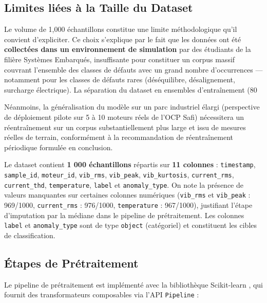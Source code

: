 \documentclass[12pt, a4paper, oneside]{report}
\begin{document}
\subsection{Limites liées à la Taille du Dataset}
Le volume de 1,000 échantillons constitue une limite méthodologique qu'il convient d'expliciter. Ce choix s'explique par le fait que les données ont été \textbf{collectées dans un environnement de simulation} par des étudiants de la filière Systèmes Embarqués, insuffisante pour constituer un corpus massif couvrant l'ensemble des classes de défauts avec un grand nombre d'occurrences — notamment pour les classes de défauts rares (déséquilibre, désalignement, surcharge électrique).
La séparation du dataset en ensembles d’entraînement (80%

Néanmoins, la généralisation du modèle sur un parc industriel élargi (perspective de déploiement pilote sur 5 à 10 moteurs réels de l’OCP Safi) nécessitera un réentraînement sur un corpus substantiellement plus large et issu de mesures réelles de terrain, conformément à la recommandation de réentraînement périodique formulée en conclusion.

Le dataset contient \textbf{1 000 échantillons} répartis sur \textbf{11 colonnes} :
\texttt{timestamp}, \texttt{sample\_id}, \texttt{moteur\_id},
\texttt{vib\_rms}, \texttt{vib\_peak}, \texttt{vib\_kurtosis}, \texttt{current\_rms},
\texttt{current\_thd}, \texttt{temperature}, \texttt{label} et \texttt{anomaly\_type}.
On note la présence de valeurs manquantes sur certaines colonnes numériques (\texttt{vib\_rms} et \texttt{vib\_peak} : 969/1000, \texttt{current\_rms} :
976/1000, \texttt{temperature} : 967/1000), justifiant l'étape d'imputation par la médiane
dans le pipeline de prétraitement. Les colonnes \texttt{label} et \texttt{anomaly\_type}
sont de type \texttt{object} (catégoriel) et constituent les cibles de classification.

\subsection{Étapes de Prétraitement}

Le pipeline de prétraitement est implémenté avec la bibliothèque Scikit-learn \cite{sklearn},
qui fournit des transformateurs composables via l'API \texttt{Pipeline} :
\end{document}
